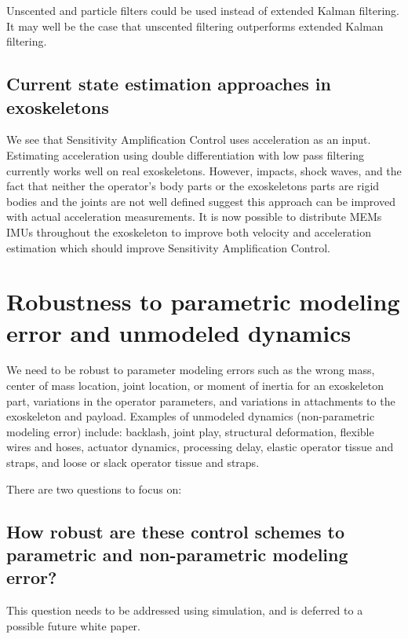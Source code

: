 \documentclass[letterpaper,12pt,fullpage]{article}
\begin{document}
Unscented and particle filters could be used instead of extended
Kalman filtering. It may well be the case that unscented filtering
outperforms extended Kalman filtering.

\subsection{Current state estimation approaches in exoskeletons}

We see that Sensitivity Amplification Control uses acceleration as an input.
Estimating acceleration using double differentiation with low pass filtering
currently works well on real exoskeletons.
However, impacts, shock waves, and the fact that neither
the operator's body parts or the exoskeletons parts are rigid bodies and the
joints are not well defined suggest this approach can be improved with actual
acceleration measurements.
It is now possible to distribute MEMs IMUs throughout the exoskeleton to
improve both velocity and 
acceleration estimation
which should improve
Sensitivity Amplification Control.


\section{Robustness to parametric modeling error and unmodeled dynamics}

We need to be robust to parameter modeling errors such as the wrong mass,
center of mass location, joint location,
or moment of inertia for an exoskeleton part, variations in the operator
parameters, and variations in attachments to the exoskeleton and payload.
Examples of unmodeled dynamics (non-parametric modeling error) include:
backlash, joint play, structural deformation, flexible wires and hoses,
actuator dynamics, processing delay,
elastic operator tissue and straps, and 
loose or slack operator tissue and straps.

There are two questions to focus on:

\subsection{How robust are these control schemes to parametric and non-parametric
modeling error?}

This question needs to be addressed using simulation, and is deferred to a 
possible future white paper.
\end{document}
